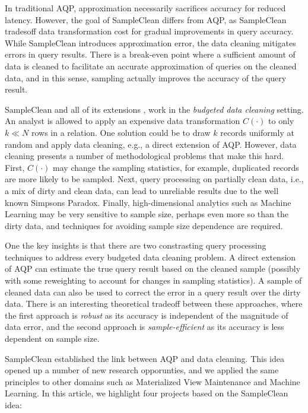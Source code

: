 In traditional AQP, approximation necessarily sacrifices accuracy for reduced latency. 
However, the goal of SampleClean differs from AQP, as SampleClean tradesoff data transformation cost for gradual improvements in query accuracy.
While SampleClean introduces approximation error, the data cleaning mitigates errors in query results.
There is a break-even point where a sufficient amount of data is cleaned to facilitate an accurate approximation of queries on the cleaned data, and in this sense, sampling actually improves the accuracy of the query result.

SampleClean \cite{wang1999sample} and all of its extensions \cite{krishnan2015svc}, work in the \emph{budgeted data cleaning} setting. 
An analyst is allowed to apply an expensive data transformation $C(\cdot)$ to only $k\ll N$ rows in a relation.
One solution could be to draw $k$ records uniformly at random and apply data cleaning, e.g., a direct extension of AQP.
However, data cleaning presents a number of methodological problems that make this hard.
First, $C(\cdot)$ may change the sampling statistics, for example, duplicated records are more likely to be sampled.
Next, query processing on partially clean data, i.e., a mix of dirty and clean data, can lead to unreliable results due to the well known Simpsons Paradox.
Finally, high-dimensional analytics such as Machine Learning may be very sensitive to sample size, perhaps even more so than the dirty data, and techniques for avoiding sample size dependence are required.

One the key insights is that there are two constrasting query processing techniques to address every budgeted data cleaning problem.
A direct extension of AQP can estimate the true query result based on the cleaned sample (possibly with some reweighting to account for changes in sampling statistics). 
A sample of cleaned data can also be used to correct the error in a query result over the dirty data.
There is an interesting theoretical tradeoff between these approaches, where the first approach is \emph{robust} as its accuracy is independent of the magnitude of data error, and the second approach is \emph{sample-efficient} as its accuracy is less dependent on sample size.

SampleClean established the link between AQP and data cleaning.
This idea opened up a number of new research opporunties, and we applied the same principles to other domains such as Materialized View Maintenance and Machine Learning.
In this article, we highlight four projects based on the SampleClean idea:


